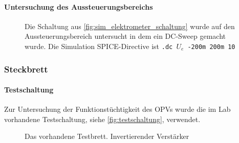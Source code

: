 \documentclass[12pt,english,ngerman]{scrartcl}
\begin{document}
\paragraph{Untersuchung des Aussteuerungsbereichs} \label{sec:mess_aussteuerungsbereich}


\begin{figure}[H]
  \centering
  \caption{Die Schaltung aus \autoref{fig:sim_elektrometer_schaltung} wurde auf
  den Aussteuerungsbereich untersucht in dem ein DC-Sweep gemacht wurde. Die
  Simulation SPICE-Directive ist \texttt{.dc $U_e$ -200m 200m 10}}
  \label{fig:sim_elektrometer_dcsweep}
\end{figure}

\subsubsection{Steckbrett} \label{sec:elektrometer_steckbrett}

\paragraph{Testschaltung}
Zur Untersuchung der Funktionstüchtigkeit des OPVs wurde die im Lab vorhandene
Testschaltung, siehe \autoref{fig:testschaltung}, verwendet. 

\begin{figure}[H]
  \centering
  \caption{Das vorhandene Testbrett. Invertierender Verstärker}
  \label{fig:testschaltung}
\end{figure}
\end{document}

